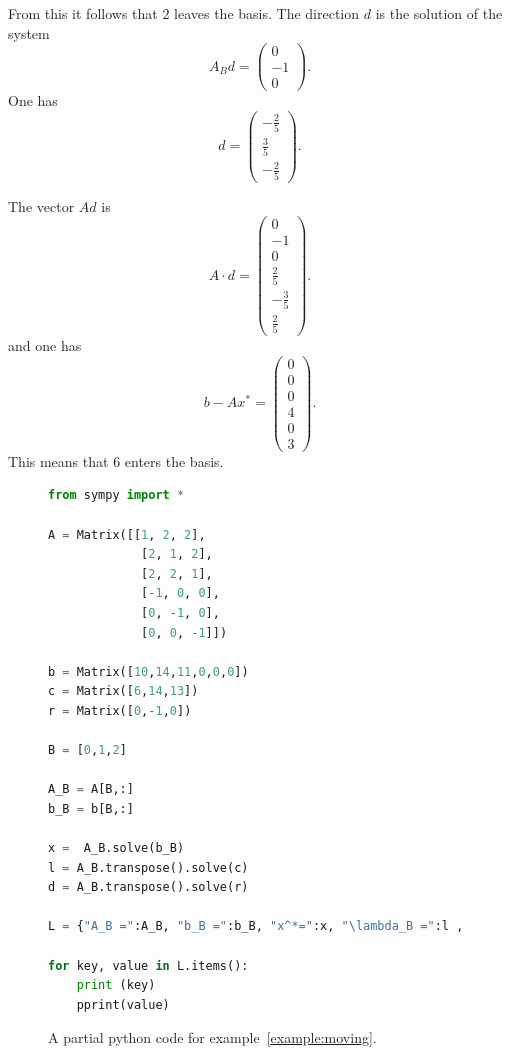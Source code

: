 \begin{example}
  From this it follows that $2$ leaves the basis. The direction $d$ is the solution of the system
  \begin{displaymath}
     A_B d =
     \begin{pmatrix}
       0\\-1\\0
     \end{pmatrix}. 
   \end{displaymath}
   One has
   \begin{displaymath}
     d = \begin{pmatrix}- \frac{2}{5}\\\frac{3}{5}\\- \frac{2}{5}\end{pmatrix}. 
   \end{displaymath}
  


The vector $Ad$ is 
\begin{displaymath}
  A ⋅ d = \begin{pmatrix}0\\-1\\0\\\frac{2}{5}\\- \frac{3}{5}\\\frac{2}{5}\end{pmatrix}. 
\end{displaymath}
and one has
\begin{displaymath}
  b-Ax^* = 
\begin{pmatrix}0\\0\\0\\4\\0\\3\end{pmatrix}.
\end{displaymath}
This means that $6$ enters the basis. 

\end{example}



\begin{figure}
  \centering
\begin{lstlisting}[language=python]
from sympy import *

A = Matrix([[1, 2, 2],
             [2, 1, 2],
             [2, 2, 1],            
             [-1, 0, 0],
             [0, -1, 0],
             [0, 0, -1]])
 
b = Matrix([10,14,11,0,0,0])
c = Matrix([6,14,13])
r = Matrix([0,-1,0])

B = [0,1,2]
 
A_B = A[B,:] 
b_B = b[B,:]
 
x =  A_B.solve(b_B) 
l = A_B.transpose().solve(c)
d = A_B.transpose().solve(r)

L = {"A_B =":A_B, "b_B =":b_B, "x^*=":x, "\lambda_B =":l , "d = ":d}

for key, value in L.items():
    print (key) 
    pprint(value) 
\end{lstlisting}

  \caption{A partial python code for example~\ref{example:moving}.}
\end{figure}\label{fig:code-2}

